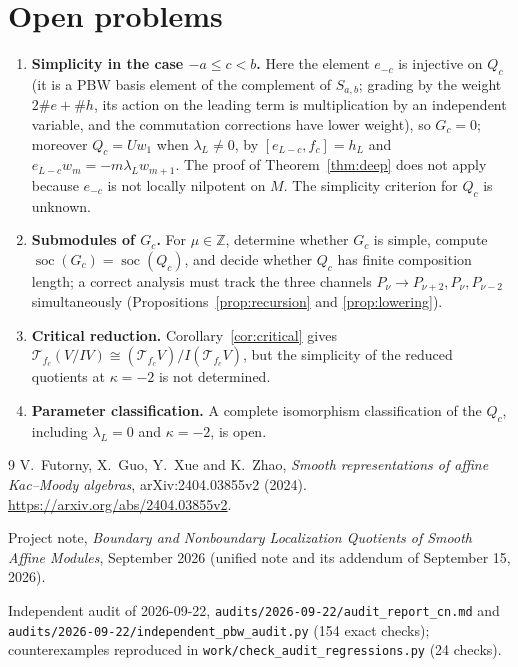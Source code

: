 \documentclass[11pt,a4paper]{article}
\newcommand{\Z}{\mathbb Z}
\newcommand{\soc}{\operatorname{soc}}
\newcommand{\T}{\mathcal T}
\begin{document}
\section{Open problems}
\label{sec:open}
\begin{enumerate}[leftmargin=*,label=\arabic*.]
\item \textbf{Simplicity in the case $-a\le c<b$.} Here the element
$e_{-c}$ is injective on $Q_c$ (it is a PBW basis element of the
complement of $S_{a,b}$; grading by the weight $2\#e+\#h$, its action on
the leading term is multiplication by an independent variable, and the
commutation corrections have lower weight), so $G_c=0$; moreover
$Q_c=Uw_1$ when $\lambda_L\ne0$, by $[e_{L-c},f_c]=h_L$ and
$e_{L-c}w_m=-m\lambda_Lw_{m+1}$. The proof of Theorem~\ref{thm:deep} does
not apply because $e_{-c}$ is not locally nilpotent on $M$. The simplicity
criterion for $Q_c$ is unknown.
\item \textbf{Submodules of $G_c$.} For $\mu\in\Z$, determine whether
$G_c$ is simple, compute $\soc(G_c)=\soc(Q_c)$, and decide whether $Q_c$
has finite composition length; a correct analysis must track the three
channels $P_\nu\to P_{\nu+2},P_\nu,P_{\nu-2}$ simultaneously
(Propositions~\ref{prop:recursion} and \ref{prop:lowering}).
\item \textbf{Critical reduction.} Corollary~\ref{cor:critical} gives
$\T_{f_c}(V/IV)\cong(\T_{f_c}V)/I(\T_{f_c}V)$, but the simplicity of the
reduced quotients at $\kappa=-2$ is not determined.
\item \textbf{Parameter classification.} A complete isomorphism
classification of the $Q_c$, including $\lambda_L=0$ and $\kappa=-2$, is
open.
\end{enumerate}

\begin{thebibliography}{9}
V.~Futorny, X.~Guo, Y.~Xue and K.~Zhao,
\emph{Smooth representations of affine Kac--Moody algebras},
arXiv:2404.03855v2 (2024).
\url{https://arxiv.org/abs/2404.03855v2}.

Project note, \emph{Boundary and Nonboundary Localization Quotients of
Smooth Affine Modules}, September 2026 (unified note and its addendum of
September 15, 2026).

Independent audit of 2026-09-22,
\texttt{audits/2026-09-22/audit\_report\_cn.md} and
\texttt{audits/2026-09-22/independent\_pbw\_audit.py} (154 exact checks);
counterexamples reproduced in
\texttt{work/check\_audit\_regressions.py} (24 checks).
\end{thebibliography}
\end{document}
